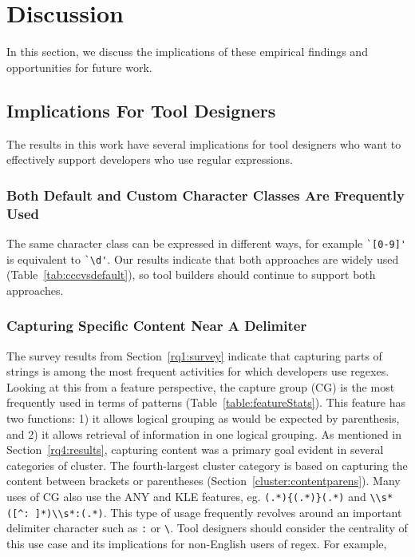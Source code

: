 \section{Discussion}
\label{sec:discussion}

In this section, we discuss the implications of these empirical findings
 and opportunities for future work.

\subsection{Implications For Tool Designers}
The results in this work have several implications for tool designers who want to effectively support developers who use regular expressions.

\subsubsection{Both Default and Custom Character Classes Are Frequently Used}
The same character class can be expressed in different ways, for example \verb!`[0-9]'! is equivalent to \verb!`\d'!.  Our results indicate that both approaches are widely used (Table~\ref{tab:cccvsdefault}), so tool builders should continue to support both approaches.

\subsubsection{Capturing Specific Content Near A Delimiter}
The survey results from Section~\ref{rq1:survey} indicate that capturing parts of strings is among the most frequent activities for which developers use regexes.
Looking at this from a feature perspective, the capture group (CG) is the most frequently used in terms of patterns (Table~\ref{table:featureStats}).  This feature has two functions: 1) it allows logical grouping as would be expected by parenthesis, and 2) it allows retrieval of information in one logical grouping.  As mentioned in Section~\ref{rq4:results}, capturing content was a primary goal evident in several categories of cluster.  The fourth-largest cluster category is based on capturing the content between brackets or parentheses (Section~\ref{cluster:contentparens}).
Many uses of CG also use the ANY and KLE features, eg. \verb!(.*){(.*)}(.*)! and \verb!\\s*([^: ]*)\\s*:(.*)!.  This type of usage frequently revolves around an important delimiter character such as \verb!:! or \verb!\!.  Tool designers should consider the centrality of this use case and its implications for non-English users of regex.  For example,


